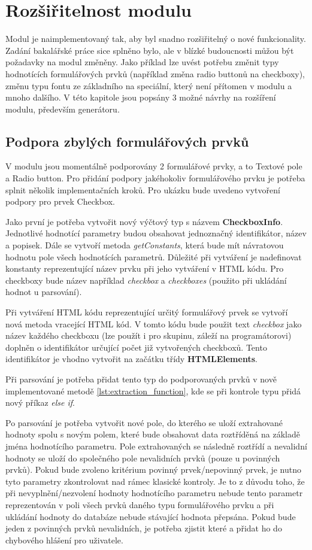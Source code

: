 \chapter{Rozšiřitelnost modulu}
Modul je naimplementovaný tak, aby byl snadno rozšiřitelný o nové funkcionality. Zadání bakalářské práce sice splněno bylo, ale v blízké budoucnosti můžou být požadavky na modul změněny. Jako příklad lze uvést potřebu změnit typy hodnotících formulářových prvků (například změna radio buttonů na checkboxy), změnu typu fontu ze základního na speciální, který není přítomen v modulu a mnoho dalšího. V této kapitole jsou popsány 3 možné návrhy na rozšíření modulu, především generátoru.

\section{Podpora zbylých formulářových prvků}
V modulu jsou momentálně podporovány 2 formulářové prvky, a to Textové pole a Radio button. Pro přidání podpory jakéhokoliv formulářového prvku je potřeba splnit několik implementačních kroků. Pro ukázku bude uvedeno vytvoření podpory pro prvek Checkbox.
\par
Jako první je potřeba vytvořit nový výčtový typ s názvem \textbf{CheckboxInfo}. Jednotlivé hodnotící parametry budou obsahovat jednoznačný identifikátor, název a popisek. Dále se vytvoří metoda \textit{getConstants}, která bude mít návratovou hodnotu pole všech hodnotících parametrů. Důležité při vytváření je nadefinovat konstanty reprezentující název prvku při jeho vytváření v HTML kódu. Pro checkboxy bude název například \textit{checkbox} a \textit{checkboxes} (použito při ukládání hodnot u parsování).
\par
Při vytváření HTML kódu reprezentující určitý formulářový prvek se vytvoří nová metoda vracející HTML kód. V tomto kódu bude použit text \textit{checkbox} jako název každého checkboxu (lze použít i pro skupinu, záleží na programátorovi) doplněn o identifikátor určující počet již vytvořených checkboxů. Tento identifikátor je vhodno vytvořit na začátku třídy \textbf{HTMLElements}.
\par
Při parsování je potřeba přidat tento typ do podporovaných prvků v nově implementované metodě \ref{lst:extraction_function}, kde se při kontrole typu přidá nový příkaz \textit{else if}.
\par
Po parsování je potřeba vytvořit nové pole, do kterého se uloží extrahované hodnoty spolu s novým polem, které bude obsahovat data roztříděná na základě jména hodnotícího parametru. Pole extrahovaných se následně roztřídí a nevalidní hodnoty se uloží do společného pole nevalidních prvků (pouze u povinných prvků). Pokud bude zvoleno kritérium povinný prvek/nepovinný prvek, je nutno tyto parametry zkontrolovat nad rámec klasické kontroly. Je to z důvodu toho, že při nevyplnění/nezvolení hodnoty hodnotícího parametru nebude tento parametr reprezentován v poli všech prvků daného typu formulářového prvku a při ukládání hodnoty do databáze nebude stávající hodnota přepsána. Pokud bude jeden z povinných prvků nevalidních, je potřeba zjistit které a přidat ho do chybového hlášení pro uživatele.

